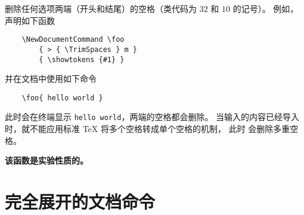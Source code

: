 \documentclass{l3doc}
\begin{document}
\begin{function}{\TrimSpaces}
\begin{syntax}
\end{syntax}
删除任何选项两端（开头和结尾）的空格（类代码为 $32$ 和 $10$ 的记号）。
例如，声明如下函数
\begin{verbatim}
    \NewDocumentCommand \foo
        { > { \TrimSpaces } m }
        { \showtokens {#1} }
\end{verbatim}
并在文档中使用如下命令
\begin{verbatim}
    \foo{ hello world }
\end{verbatim}
%
此时会在终端显示 \texttt{hello world}，两端的空格都会删除。
当输入的内容已经导入时，就不能应用标准 \TeX{} 将多个空格转成单个空格的机制，
此时  会删除多重空格。

\textbf{该函数是实验性质的。}
%
\end{function}

%
\section{完全展开的文档命令}
\end{document}

